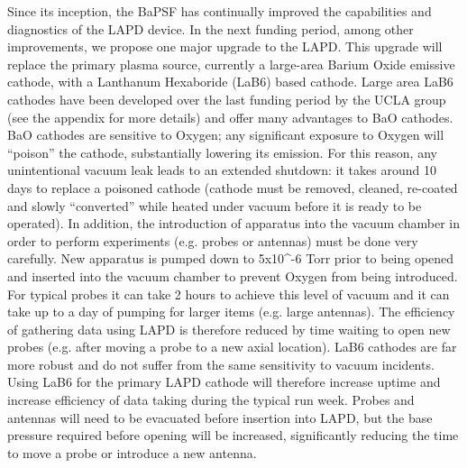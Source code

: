 \documentclass[11pt]{article}
\begin{document}
Since its inception, the BaPSF has continually improved the capabilities
and diagnostics of the LAPD device. In the next funding period, among
other improvements, we propose one major upgrade to the LAPD. This
upgrade will replace the primary plasma source, currently a large-area
Barium Oxide emissive cathode, with a Lanthanum Hexaboride (LaB6) based
cathode. Large area LaB6 cathodes have been developed over the last
funding period by the UCLA group (see the appendix for more details) and
offer many advantages to BaO cathodes. BaO cathodes are sensitive to
Oxygen; any significant exposure to Oxygen will ``poison'' the cathode,
substantially lowering its emission. For this reason, any unintentional
vacuum leak leads to an extended shutdown: it takes around 10 days to
replace a poisoned cathode (cathode must be removed, cleaned, re-coated
and slowly ``converted'' while heated under vacuum before it is ready to
be operated). In addition, the introduction of apparatus into the vacuum
chamber in order to perform experiments (e.g. probes or antennas) must
be done very carefully. New apparatus is pumped down to 5x10\^{}-6 Torr
prior to being opened and inserted into the vacuum chamber to prevent
Oxygen from being introduced. For typical probes it can take 2 hours to
achieve this level of vacuum and it can take up to a day of pumping for
larger items (e.g. large antennas). The efficiency of gathering data
using LAPD is therefore reduced by time waiting to open new probes (e.g.
after moving a probe to a new axial location). LaB6 cathodes are far
more robust and do not suffer from the same sensitivity to vacuum
incidents. Using LaB6 for the primary LAPD cathode will therefore
increase uptime and increase efficiency of data taking during the
typical run week. Probes and antennas will need to be evacuated before
insertion into LAPD, but the base pressure required before opening will
be increased, significantly reducing the time to move a probe or
introduce a new antenna.
\end{document}
